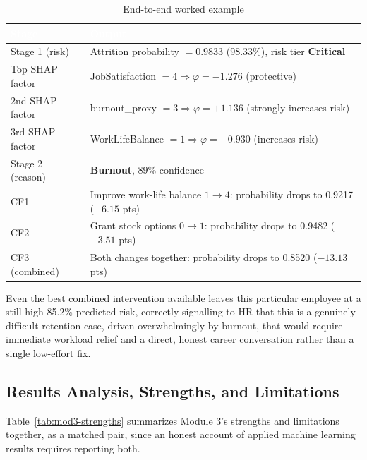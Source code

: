 \documentclass[11pt,a4paper]{article}
\newcommand{\hdrow}{\rowcolor{TPnavy}}
\newcommand{\hdtxt}[1]{\textcolor{white}{\bfseries #1}}
\begin{document}
\begin{table}[H]
\centering
\caption{End-to-end worked example}
\label{tab:mod3-example}
\small
\begin{tabular}{p{4.4cm}p{8.0cm}}
\toprule
\hdrow \hdtxt{Stage} & \hdtxt{Output} \\
\midrule
Stage 1 (risk) & Attrition probability $= 0.9833$ (98.33\%), risk tier \textbf{Critical} \\
\rowcolor{TPlight}
Top SHAP factor & JobSatisfaction $=4 \Rightarrow \varphi = -1.276$ (protective) \\
2nd SHAP factor & burnout\_proxy $=3 \Rightarrow \varphi = +1.136$ (strongly increases risk) \\
\rowcolor{TPlight}
3rd SHAP factor & WorkLifeBalance $=1 \Rightarrow \varphi = +0.930$ (increases risk) \\
Stage 2 (reason) & \textbf{Burnout}, 89\% confidence \\
\rowcolor{TPlight}
CF1 & Improve work-life balance $1 \to 4$: probability drops to 0.9217 ($-6.15$ pts) \\
CF2 & Grant stock options $0 \to 1$: probability drops to 0.9482 ($-3.51$ pts) \\
\rowcolor{TPlight}
CF3 (combined) & Both changes together: probability drops to 0.8520 ($-13.13$ pts) \\
\bottomrule
\end{tabular}
\end{table}

Even the best combined intervention available leaves this particular employee at a still-high 85.2\% predicted risk, correctly signalling to HR that this is a genuinely difficult retention case, driven overwhelmingly by burnout, that would require immediate workload relief and a direct, honest career conversation rather than a single low-effort fix.

\subsection{Results Analysis, Strengths, and Limitations}
\label{sec:mod3-limits}

Table~\ref{tab:mod3-strengths} summarizes Module 3's strengths and limitations together, as a matched pair, since an honest account of applied machine learning results requires reporting both.
\end{document}
